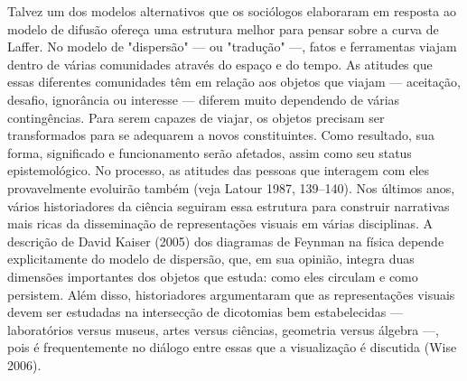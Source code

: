 \documentclass[12pt]{article}
\begin{document}
Talvez um dos modelos alternativos que os sociólogos elaboraram em resposta ao modelo de difusão ofereça uma estrutura melhor para pensar sobre a curva de Laffer. No modelo de "dispersão" — ou "tradução" —, fatos e ferramentas viajam dentro de várias comunidades através do espaço e do tempo. As atitudes que essas diferentes comunidades têm em relação aos objetos que viajam — aceitação, desafio, ignorância ou interesse — diferem muito dependendo de várias contingências. Para serem capazes de viajar, os objetos precisam ser transformados para se adequarem a novos constituintes. Como resultado, sua forma, significado e funcionamento serão afetados, assim como seu status epistemológico. No processo, as atitudes das pessoas que interagem com eles provavelmente evoluirão também (veja Latour 1987, 139–140). Nos últimos anos, vários historiadores da ciência seguiram essa estrutura para construir narrativas mais ricas da disseminação de representações visuais em várias disciplinas. A descrição de David Kaiser (2005) dos diagramas de Feynman na física depende explicitamente do modelo de dispersão, que, em sua opinião, integra duas dimensões importantes dos objetos que estuda: como eles circulam e como persistem. Além disso, historiadores argumentaram que as representações visuais devem ser estudadas na intersecção de dicotomias bem estabelecidas — laboratórios versus museus, artes versus ciências, geometria versus álgebra —, pois é frequentemente no diálogo entre essas que a visualização é discutida (Wise 2006).
\end{document}
